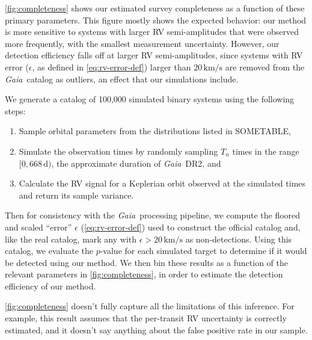 \documentclass[modern, letterpaper]{aastex631}
\newcommand{\project}[1]{\textsl{#1}}
\newcommand{\Gaia}{\project{Gaia}}
\begin{document}
\autoref{fig:completeness} shows our estimated survey completeness as a function of these primary parameters.
This figure mostly shows the expected behavior: our method is more sensitive to systems with larger RV semi-amplitudes that were observed more frequently, with the smallest measurement uncertainty.
However, our detection efficiency falls off at larger RV semi-amplitudes, since systems with RV error ($\epsilon$, as defined in \autoref{eq:rv-error-def}) larger than $20\,\mathrm{km/s}$ are removed from the \Gaia\ catalog as outliers, an effect that our simulations include.

We generate a catalog of 100,000 simulated binary systems using the following steps:
\begin{enumerate}
	\item Sample orbital parameters from the distributions listed in SOMETABLE,
	\item Simulate the observation times by randomly sampling $T_n$ times in the range $[0, 668\,\mathrm{d})$, the approximate duration of \Gaia\ DR2, and
	\item Calculate the RV signal for a Keplerian orbit observed at the simulated times and return its sample variance.
\end{enumerate}
Then for consistency with the \Gaia\ processing pipeline, we compute the floored and scaled ``error'' $\epsilon$ (\autoref{eq:rv-error-def}) used to construct the official catalog and, like the real catalog, mark any with $\epsilon > 20\,\mathrm{km/s}$ as non-detections.
Using this catalog, we evaluate the $p$-value for each simulated target to determine if it would be detected using our method.
We then bin these results as a function of the relevant parameters in \autoref{fig:completeness}, in order to estimate the detection efficiency of our method.

\autoref{fig:completeness} doesn't fully capture all the limitations of this inference.
For example, this result assumes that the per-transit RV uncertainty is correctly estimated, and it doesn't say anything about the false positive rate in our sample.

\end{document}
